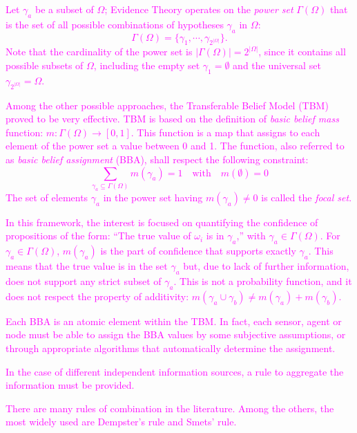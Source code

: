 \documentclass[journal]{IEEEtran}
\newcommand{\GO}[1]{\textcolor{magenta}{{#1}}}
\begin{document}
\GO{Let $\gamma_a$ be a subset of $\Omega$; Evidence Theory operates on the \textit{power set} $\Gamma(\Omega)$ that is the set of all possible combinations of hypotheses $\gamma_a$ in $\Omega$:
\begin{equation}
\Gamma(\Omega)  = \{ \gamma_1, \cdots, \gamma_{2^{|\Omega|}}\}.
\end{equation}
Note that the cardinality of the power set is $|\Gamma(\Omega)| = 2^ {|\Omega|}$, since it contains all possible subsets of $\Omega$, including the empty set $\gamma_1 = \emptyset$ and the universal set $\gamma_{2^{|\Omega|}} = \Omega$.}

\GO{Among the other possible approaches, the Transferable Belief Model (TBM) \cite{smets_transferable_1990} proved to be very effective. TBM is based on the definition of \textit{basic belief mass} function: $m : \Gamma(\Omega) \rightarrow [0, 1] $. This function is a map that assigns to each element of the power set a value between 0 and 1. The function, also referred to as \textit{basic belief assignment} (BBA), shall respect the following constraint:
\begin{equation}
\displaystyle\sum_{\gamma_a\subseteq \Gamma(\Omega)} m(\gamma_a) = 1 \quad\mathrm{ with }\quad m(\emptyset) = 0
\label{eq:bba}
\end{equation}
The set of elements $\gamma_a$ in the power set having $m(\gamma_a)\neq 0$ is called the \textit{focal set}.}

\GO{In this framework, the interest is focused on quantifying the confidence of propositions of the form: ``The true value of $\omega_i$ is in $\gamma_a$,'' with $\gamma_a \in \Gamma(\Omega)$. For $\gamma_a \in \Gamma(\Omega)$, $m(\gamma_a)$ is the part of confidence that supports exactly $\gamma_a$. This means that the true value is in the set $\gamma_a$ but, due to lack of further information, does not support any strict subset of $\gamma_a$. 
This is not a probability function, and it does not respect the property of additivity: $m (\gamma_a \cup \gamma_b) \neq m(\gamma_a) +m (\gamma_b).$} 
 
\GO{Each BBA is an atomic element within the TBM. In fact, each sensor, agent or node must be able to assign the BBA values by some subjective assumptions, or through appropriate algorithms that automatically determine the assignment.}

\GO{In the case of different independent information sources, a rule to aggregate the information must be provided.}

\GO{There are many rules of combination in the literature. Among the others, the most widely used are Dempster's rule and Smets' rule.}
\end{document}
